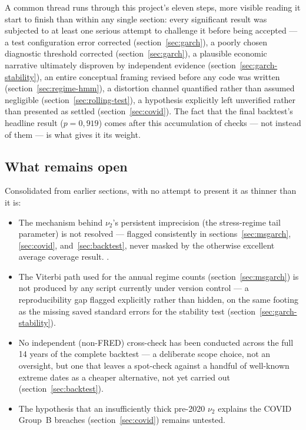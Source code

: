 \documentclass[12pt,a4paper]{article}
\begin{document}
	A common thread runs through this project's eleven steps,
	more visible reading it start to finish than within
	any single section: every significant result was subjected to at
	least one serious attempt to challenge it before being
	accepted --- a test configuration error corrected
	(section~\ref{sec:garch}), a poorly chosen diagnostic
	threshold corrected (section~\ref{sec:garch}), a
	plausible economic narrative ultimately disproven by
	independent evidence (section~\ref{sec:garch-stability}), an
	entire conceptual framing revised before any code was written
	(section~\ref{sec:regime-hmm}), a distortion channel quantified rather
	than assumed negligible (section~\ref{sec:rolling-test}), a
	hypothesis explicitly left unverified rather than presented as settled
	(section~\ref{sec:covid}). The fact that the final backtest's
	headline result ($p=0{,}919$) comes after this accumulation of
	checks --- not instead of them --- is what gives it its weight.
	
	\subsection{What remains open}
	
	Consolidated from earlier sections, with no attempt to
	present it as thinner than it is:
	
	\begin{itemize}
		\item The mechanism behind $\nu_2$'s persistent
		imprecision (the stress-regime tail parameter) is not resolved ---
		flagged consistently in sections~\ref{sec:msgarch},
		\ref{sec:covid}, and~\ref{sec:backtest}, never masked by the
		otherwise excellent average coverage result.
		.
		\item The Viterbi path used for the annual regime
		counts (section~\ref{sec:msgarch}) is not produced by any
		script currently under version control --- a reproducibility
		gap flagged explicitly rather than hidden, on the same footing
		as the missing saved standard errors for the stability test
		(section~\ref{sec:garch-stability}).
		\item No independent (non-FRED) cross-check has been
		conducted across the full 14 years of the complete backtest --- a
		deliberate scope choice, not an oversight, but one that leaves a
		spot-check against a handful of well-known extreme dates as a
		cheaper alternative, not yet carried out
		(section~\ref{sec:backtest}).
		\item The hypothesis that an insufficiently thick pre-2020
		$\nu_2$ explains the COVID Group~B breaches
		(section~\ref{sec:covid}) remains untested.
	\end{itemize}
	
\end{document}
